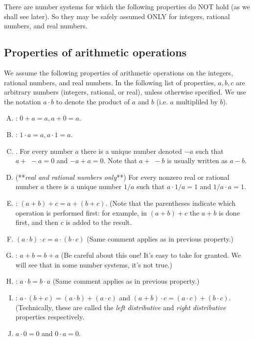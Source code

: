 \begin{warn}
There are number systems for which the following properties do NOT hold (as we shall see later). So they may be safely assumed ONLY for integers, rational numbers, and real numbers.
\end{warn}

\subsection{Properties of arithmetic operations}
\label{subsec:Preliminaries:OpsAndRels}

We assume the following properties of arithmetic operations on the integers, rational numbers, and real numbers. In the following list of properties, $a,b,c$ are arbitrary numbers (integers, rational, or real), unless otherwise specified. We use the notation $a \cdot b$ to denote the product of $a$ and $b$ (i.e. $a$ multipliled by $b$).

\begin{enumerate}[(A)]
\item
{}:   $0+a =a, a+0=a$.
\item
{}:   $1 \cdot a =a, a \cdot 1=a$.
\item
{}. For every number $a$ there is a unique number denoted $-a$ such that $a + \,\,-a=0$ and $-a + a = 0$.   Note that $a +\,\,-b$ is usually written as $a-b$.
\item
{} (**\emph{real and rational numbers only}**)   For every nonzero real or rational number $a$ there is a unique number $1/a$ such that $a \cdot 1/a = 1$ and $1/a \cdot a = 1$.  
\item
{}: $(a+b)+c = a+(b+c)$.  (Note that the parentheses indicate which operation is performed first: for example, in $(a+b)+c$ the $a+b$ is done first, and then $c$ is added to the result. 
\item
{} $(a\cdot b) \cdot c= a\cdot(b\cdot c)$  (Same comment applies as in previous property.)
\item
{}: $a+b = b+a$  (Be careful about this one!  It's easy to take for granted.  We will see that in some number systems, it's not true.)
\item
{}: $a\cdot b = b\cdot a$  (Same comment applies as in previous property.)
\item
{}:   $a\cdot (b + c) = (a\cdot b) + (a \cdot c)$ and $(a+b)\cdot c = (a \cdot c) + (b \cdot c)$.  (Technically, these are called the  \emph{left distributive} and \emph{right distributive} properties respectively.
\item {}
$a \cdot 0 = 0$ and $0 \cdot a = 0$.
\end {enumerate}


